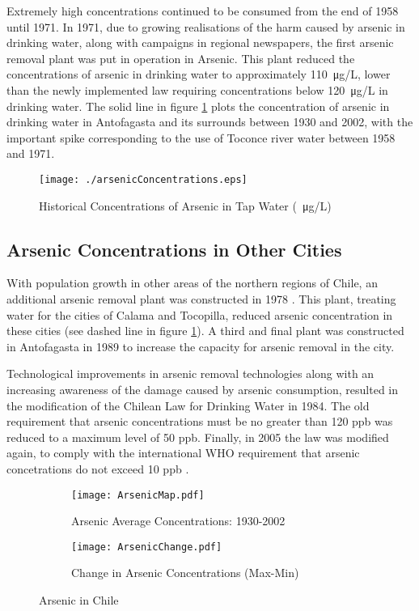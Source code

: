 \documentclass{article}[12pt,subeqn]
\begin{document}
\begin{spacing}{1.4}
Extremely high concentrations continued to be consumed from the end of
1958 until 1971.  In 1971, due to growing realisations of the harm
caused by arsenic in drinking water, along with campaigns in regional
newspapers, the first arsenic removal plant was put in operation in
Arsenic.  This plant reduced the concentrations of arsenic in drinking
water to approximately \SI{110}{\micro\gram}/L, lower than the newly
implemented law requiring concentrations below \SI{120}{\micro\gram}/L
in drinking water.  The solid line in figure \ref{ASfig:arsenic} plots
the concentration of arsenic in drinking water in Antofagasta and its
surrounds between 1930 and 2002, with the important spike
corresponding to the use of Toconce river water between 1958 and 1971.

\begin{figure}[htpb]
\texttt{[image: ./arsenicConcentrations.eps]}
\caption{Historical Concentrations of Arsenic in Tap Water (\SI{}{\micro\gram}/L)}
\label{ASfig:arsenic}
\end{figure}

\subsection{Arsenic Concentrations in Other Cities}
With population growth in other areas of the northern regions of
Chile, an additional arsenic removal plant was constructed in 1978
\citep{MainoRecabarren2012}. This plant, treating water for the cities
of Calama and Tocopilla, reduced arsenic concentration in these cities
(see dashed line in figure \ref{ASfig:arsenic}).  A third and final
plant was constructed in Antofagasta in 1989 to increase the capacity
for arsenic removal in the city.

Technological improvements in arsenic removal technologies along with
an increasing awareness of the damage caused by arsenic consumption,
resulted in the modification of the Chilean Law for Drinking Water in
1984.  The old requirement that arsenic concentrations must be no
greater than 120 ppb was reduced to a maximum level of 50
ppb. Finally, in 2005 the law was modified again, to comply with the
international WHO requirement that arsenic concetrations do not exceed
10 ppb \citep{WHO2001}.




\newpage
\begin{figure}
\centering
\begin{subfigure}{.5\textwidth}
  \centering
  \texttt{[image: ArsenicMap.pdf]}
  \caption{Arsenic Average Concentrations: 1930-2002}
  \label{fig:sub1}
\end{subfigure}%
\begin{subfigure}{.5\textwidth}
  \centering
  \texttt{[image: ArsenicChange.pdf]}
  \caption{Change in Arsenic Concentrations (Max-Min)}
  \label{fig:sub2}
\end{subfigure}
\caption{Arsenic in Chile}
\label{fig:test}
\end{figure}


\clearpage

\newpage


\end{spacing}
\end{document}
